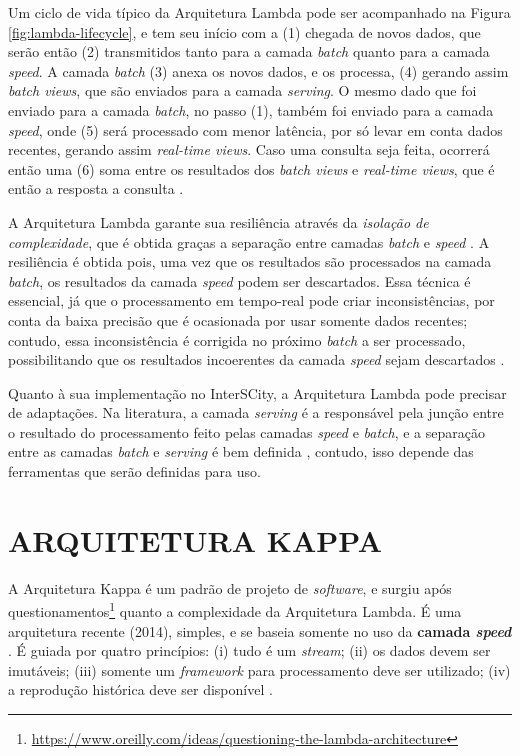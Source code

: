 Um ciclo de vida típico da Arquitetura Lambda pode ser acompanhado na Figura
\ref{fig:lambda-lifecycle}, e tem seu início com a (1) chegada
de novos dados, que serão então (2) transmitidos tanto para a camada
\textit{batch} quanto para a camada \textit{speed}. A camada \textit{batch}
(3) anexa os novos dados, e os processa, (4) gerando assim
\textit{batch views}, que são enviados para a camada \textit{serving}. O mesmo
dado que foi enviado para a camada \textit{batch}, no passo (1), também foi
enviado para a camada \textit{speed}, onde (5) será processado com menor latência,
por só levar em conta dados recentes, gerando assim \textit{real-time views}. 
Caso uma consulta seja feita, ocorrerá então uma (6) soma entre os resultados
dos \textit{batch views} e \textit{real-time views}, que é então a resposta
a consulta \cite{marz2015}.

A Arquitetura Lambda garante sua resiliência através da \textit{isolação de
complexidade}, que é obtida graças a separação entre camadas \textit{batch}
e \textit{speed} \cite{marz2015}. A resiliência é obtida pois, uma vez que os
resultados são processados na camada \textit{batch}, os resultados da camada
\textit{speed} podem ser descartados. Essa técnica é essencial, já que o
processamento em tempo-real pode criar inconsistências, por conta da baixa
precisão que é ocasionada por usar somente dados recentes; contudo, essa
inconsistência é corrigida no próximo \textit{batch} a ser processado,
possibilitando que os resultados incoerentes da camada \textit{speed} sejam
descartados \cite{marz2015}.

Quanto à sua implementação no InterSCity, a Arquitetura Lambda pode precisar de
adaptações. Na literatura, a camada \textit{serving} é a responsável pela
junção entre o resultado do processamento feito pelas camadas \textit{speed} e
\textit{batch}, e a separação entre as camadas \textit{batch} e \textit{serving}
é bem definida \cite{marz2015}, contudo, isso depende das ferramentas que
serão definidas para uso. 

\section{ARQUITETURA KAPPA}

A Arquitetura Kappa é um padrão de projeto de \textit{software}, e surgiu após
questionamentos\footnote{\url{https://www.oreilly.com/ideas/questioning-the-lambda-architecture}}
quanto a complexidade da Arquitetura Lambda. É uma arquitetura recente (2014),
simples, e se baseia somente no uso da \textbf{camada \textit{speed}}
\cite{seyvet2016}. É guiada por quatro princípios:
(i) tudo é um \textit{stream}; (ii) os dados devem ser imutáveis; (iii)
somente um \textit{framework} para processamento deve ser utilizado; (iv) a
reprodução histórica deve ser disponível \cite{seyvet2016}.

